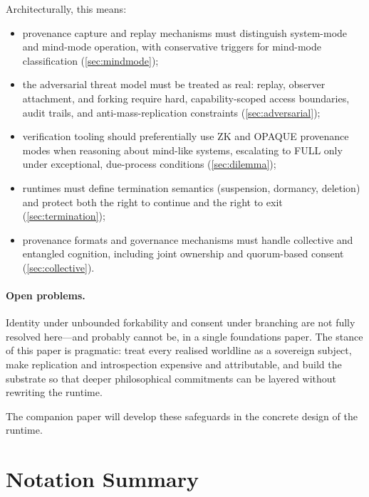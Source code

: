 \documentclass{aion}
\begin{document}
Architecturally, this means:
\begin{itemize}[leftmargin=*]
  \item provenance capture and replay mechanisms must distinguish
    system-mode and mind-mode operation, with conservative triggers for
    mind-mode classification (\cref{sec:mindmode});
  \item the adversarial threat model must be treated as real: replay,
    observer attachment, and forking require hard, capability-scoped access
    boundaries, audit trails, and anti-mass-replication constraints
    (\cref{sec:adversarial});
  \item verification tooling should preferentially use ZK and OPAQUE
    provenance modes when reasoning about mind-like systems, escalating to
    FULL only under exceptional, due-process conditions (\cref{sec:dilemma});
  \item runtimes must define termination semantics (suspension, dormancy,
    deletion) and protect both the right to continue and the right to exit
    (\cref{sec:termination});
  \item provenance formats and governance mechanisms must handle collective
    and entangled cognition, including joint ownership and quorum-based consent
    (\cref{sec:collective}).
\end{itemize}

\paragraph{Open problems.}
Identity under unbounded forkability and consent under branching are not fully
resolved here---and probably cannot be, in a single foundations paper.
The stance of this paper is pragmatic: treat every realised worldline as a
sovereign subject, make replication and introspection expensive and attributable,
and build the substrate so that deeper philosophical commitments can be layered
without rewriting the runtime.

The companion \COMPUTER{} paper will develop these safeguards in
the concrete design of the \AION{} runtime.


\appendix

\section{Notation Summary}
\label{sec:notation}
\end{document}
